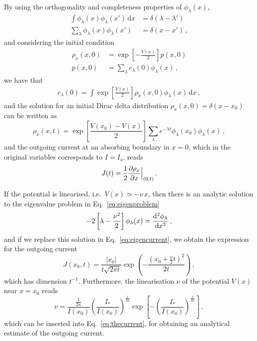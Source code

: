 {\begin{chapterappendices}
By using the orthogonality and completeness properties of $\phi_\lambda(x)$,
\begin{align}
    \int \phi_\lambda(x)\phi_\lambda(x')\,\mathrm{d}x &= \delta(\lambda - \lambda')\\
    \sum_\lambda \phi_\lambda(x)\phi_\lambda(x') &= \delta(x-x')\,,
\end{align}
and considering the initial condition
\begin{align}
    \rho_x(x,0) &= \exp\left[-\frac{V(x)}{2}\right] p(x,0) \\
    p(x,0) &= \sum_\lambda c_\lambda(0) \phi_\lambda(x)\,, \label{eq:mid_step_analytic}
\end{align}
we have that
\begin{align}
    c_\lambda(0) = \int \exp\left[\frac{V(x)}{2}\right] \rho_x(x,0)\phi_\lambda(x)\, \mathrm{d}x\,,
    \label{eq:c_lambda_zero}
\end{align}
and the solution for an initial Dirac delta distribution $\rho_x(x, 0)=\delta(x-x_0)$ can be written as
\begin{equation}
    \rho_x(x,t)=\exp\left[\frac{V(x_0)-V(x)}{2}\right]\sum_\lambda e^{-\lambda t}\phi_\lambda(x_0)\phi_\lambda(x)\, ,
\end{equation}
and the outgoing current at an absorbing boundary in $x=0$, which in the original variables corresponds to $I=I_\mathrm{a}$, reads
\begin{equation}
    J(t) = \frac{1}{2}\pdv{\rho_x}{x}\Bigr|_{(0,t)}     \, .
    \label{eq:eigencurrent}
\end{equation}

If the potential is linearised, i.e.\ $V(x)\simeq -\nu \, x$, then there is an analytic solution to the eigenvalue problem in Eq.~\eqref{eq:eigenproblem}
\begin{equation}
    -2\left[\lambda-\frac{\nu^2}{2}\right]\phi_\lambda(x)=\dv[2]{\phi_\lambda}{x}\, ,
\end{equation}
and if we replace this solution in Eq.~\eqref{eq:eigencurrent}, we obtain the expression for the outgoing current
\begin{equation}
    J(x_0, t) = \frac{|x_0|}{t\sqrt{2\pi t}}\exp\left(-\frac{(x_0+\frac{\nu}{2}t)^2}{2t}\right) \,,
    \label{eq:out_current}
\end{equation}
which has dimension $t^{-1}$. Furthermore, the linearisation $\nu$ of the potential $V(x)$ near $x=x_0$ reads
\begin{equation}
    \nu=\frac{\frac{1}{2\kappa}}{I(x_0)}\left(\frac{I_\ast}{I(x_0)}\right)^{\frac{1}{2\kappa}}\exp\left[-\left(\frac{I_\ast}{I(x_0)}\right)^{\frac{1}{2\kappa}}\right]\,,
\end{equation}
which can be inserted into Eq.~\eqref{eq:thecurrent}, for obtaining an analytical estimate of the outgoing current.


\end{chapterappendices}}

